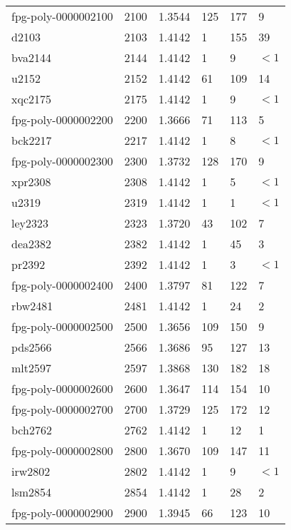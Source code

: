 \begin{longtable}{|lrrlll|}
fpg-poly-0000002100 & 2100 & \num{1.3544} & \num{125} & \num{177} & \num{9} \\
d2103 & 2103 & \num{1.4142} & \num{1} & \num{155} & \num{39} \\
bva2144 & 2144 & \num{1.4142} & \num{1} & \num{9} & $<1$ \\
u2152 & 2152 & \num{1.4142} & \num{61} & \num{109} & \num{14} \\
xqc2175 & 2175 & \num{1.4142} & \num{1} & \num{9} & $<1$ \\
fpg-poly-0000002200 & 2200 & \num{1.3666} & \num{71} & \num{113} & \num{5} \\
bck2217 & 2217 & \num{1.4142} & \num{1} & \num{8} & $<1$ \\
fpg-poly-0000002300 & 2300 & \num{1.3732} & \num{128} & \num{170} & \num{9} \\
xpr2308 & 2308 & \num{1.4142} & \num{1} & \num{5} & $<1$ \\
u2319 & 2319 & \num{1.4142} & \num{1} & \num{1} & $<1$ \\
ley2323 & 2323 & \num{1.3720} & \num{43} & \num{102} & \num{7} \\
dea2382 & 2382 & \num{1.4142} & \num{1} & \num{45} & \num{3} \\
pr2392 & 2392 & \num{1.4142} & \num{1} & \num{3} & $<1$ \\
fpg-poly-0000002400 & 2400 & \num{1.3797} & \num{81} & \num{122} & \num{7} \\
rbw2481 & 2481 & \num{1.4142} & \num{1} & \num{24} & \num{2} \\
fpg-poly-0000002500 & 2500 & \num{1.3656} & \num{109} & \num{150} & \num{9} \\
pds2566 & 2566 & \num{1.3686} & \num{95} & \num{127} & \num{13} \\
mlt2597 & 2597 & \num{1.3868} & \num{130} & \num{182} & \num{18} \\
fpg-poly-0000002600 & 2600 & \num{1.3647} & \num{114} & \num{154} & \num{10} \\
fpg-poly-0000002700 & 2700 & \num{1.3729} & \num{125} & \num{172} & \num{12} \\
bch2762 & 2762 & \num{1.4142} & \num{1} & \num{12} & \num{1} \\
fpg-poly-0000002800 & 2800 & \num{1.3670} & \num{109} & \num{147} & \num{11} \\
irw2802 & 2802 & \num{1.4142} & \num{1} & \num{9} & $<1$ \\
lsm2854 & 2854 & \num{1.4142} & \num{1} & \num{28} & \num{2} \\
fpg-poly-0000002900 & 2900 & \num{1.3945} & \num{66} & \num{123} & \num{10} \\

\end{longtable}
